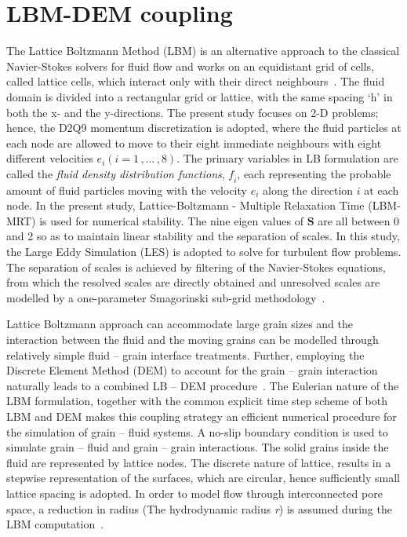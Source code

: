 \documentclass[epj,twocolumn]{webofc}
\begin{document}
\section{LBM-DEM coupling}
The Lattice Boltzmann Method (LBM) is an alternative approach to
the classical Navier-Stokes solvers for fluid flow and works on an
equidistant grid of cells, called lattice cells, which interact only with
their direct neighbours~\cite{He1997}. The fluid domain is divided into
a rectangular grid or lattice, with the same spacing ‘h’ in both the x-
and the y-directions. The present study focuses on 2-D problems; hence,
the D2Q9 momentum discretization is adopted, where the fluid particles at
each node are allowed to move to their eight immediate neighbours
with eight different velocities $\mathit{e_i} (\mathit{i}=1\,,\dots\,,8)$.
The primary variables in LB formulation are called the \textit{fluid 
density distribution functions}, $\mathit{f_i}$, each representing the probable 
amount of fluid particles moving with the velocity $\mathit{e_i}$ along the 
direction $\mathit{i}$ at each node. In the present study, Lattice-Boltzmann
- Multiple Relaxation Time (LBM-MRT) is used for numerical stability.
The nine eigen values of $\mathbf{S}$ are all between 0 and 2 so as to
maintain linear stability and the separation of scales. In  this  study,
the Large Eddy Simulation (LES) is adopted to solve for turbulent flow
problems. The separation of scales is achieved by filtering of the
Navier-Stokes equations, from which the resolved scales are directly
obtained and unresolved scales are modelled by a one-parameter
Smagorinski sub-grid methodology~\cite{Smagorinsky1963}. 

Lattice Boltzmann approach can accommodate large grain sizes and the
interaction between the fluid and the moving grains can be modelled
through relatively simple fluid – grain interface treatments. Further,
employing the Discrete Element Method (DEM) to account for the
grain – grain interaction naturally leads to a combined LB – DEM
procedure~\cite{Kumar2012}. The Eulerian nature of the LBM formulation,
together with the common explicit time step scheme of both LBM and DEM
makes this coupling strategy an efficient numerical procedure for the
simulation of grain – fluid systems. A no-slip boundary condition is
used to simulate grain – fluid and grain – grain interactions. The
solid grains inside the fluid are represented by lattice
nodes. The discrete nature of lattice, results in a stepwise
representation of the surfaces, which are circular, hence
sufficiently small lattice spacing is adopted. In order to model flow
through interconnected pore space, a reduction in radius (The
hydrodynamic radius \textit{r}) is assumed during the
LBM computation~\citep{soundararajan2015}.
\end{document}
